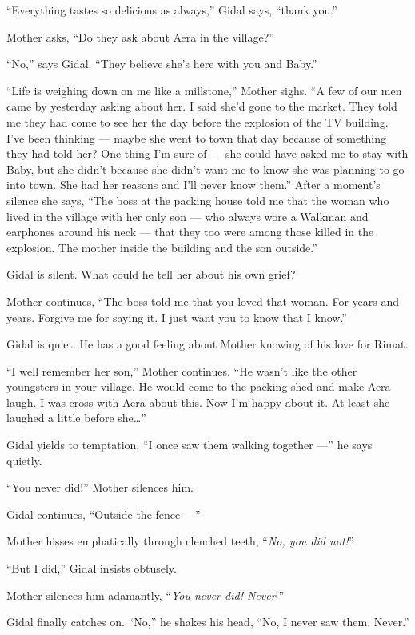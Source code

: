 \documentclass[twoside,11pt,openany]{book}
\begin{document}
``Everything tastes so delicious as always,'' Gidal says, ``thank
you.''

Mother asks, ``Do they ask about Aera in the village?''

``No,'' says Gidal. ``They believe she's here with you and Baby.''

``Life is weighing down on me like a millstone,'' Mother sighs. ``A few of our
men came by yesterday asking about her. I said she'd gone to the market. They told me they had come to see her the day
before the explosion of the TV building. I've been thinking --- maybe she went to town that day because of something they
had told her?  One thing I'm sure of --- she could have asked me to stay with Baby, but she didn't because she didn't
want me to know she was planning to go into town. She had her reasons and I'll never know them.'' After a moment's
silence she says, ``The boss at the packing house told me that the woman who lived in the village with her
only son --- who always wore a Walkman and earphones around his neck --- that they too were among those killed in
the explosion. The mother inside the building and the son outside.''

Gidal is silent. What could he tell her about his own grief?

Mother continues, ``The boss told me that you loved that woman. For years and years. Forgive me for saying
it. I just want you to know that I know.''

Gidal is quiet. He has a good feeling about Mother knowing of his love for Rimat.

``I well remember her son,'' Mother continues. ``He wasn't like the other
youngsters in your village. He would come to the packing shed and make Aera laugh. I was cross with Aera about this.
Now I'm happy about it. At least she laughed a little before she{\ldots}''

Gidal yields to temptation, ``I once saw them walking together ---'' he says quietly.

``You never did!'' Mother silences him.

Gidal continues, ``Outside the fence ---''

Mother hisses emphatically through clenched teeth, ``\textit{No, you did not!}''

``But I did,'' Gidal insists obtusely.

Mother silences him adamantly, ``\textit{You never did! Never}!''

Gidal finally catches on. ``No,'' he shakes his head, ``No, I never saw them. Never.''
\end{document}
